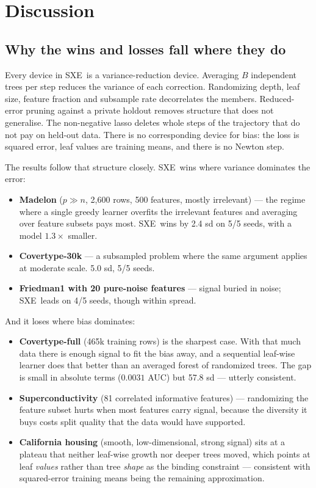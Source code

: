 \documentclass[11pt,a4paper]{article}
\newcommand{\SXE}{\textsc{SXE}}
\theoremstyle{definition}
\begin{document}
\section{Discussion}\label{sec:discussion}

\subsection{Why the wins and losses fall where they do}

Every device in \SXE\ is a variance-reduction device. Averaging $B$ independent
trees per step reduces the variance of each correction. Randomizing depth, leaf
size, feature fraction and subsample rate decorrelates the members.
Reduced-error pruning against a private holdout removes structure that does not
generalise. The non-negative lasso deletes whole steps of the trajectory that
do not pay on held-out data. There is no corresponding device for bias: the
loss is squared error, leaf values are training means, and there is no Newton
step.

The results follow that structure closely. \SXE\ wins where variance dominates
the error:
\begin{itemize}[leftmargin=1.5em,itemsep=1pt]
\item \textbf{Madelon} ($p \gg n$, 2{,}600 rows, 500 features, mostly
irrelevant) --- the regime where a single greedy learner overfits the
irrelevant features and averaging over feature subsets pays most. \SXE\ wins by
2.4 sd on 5/5 seeds, with a model $1.3\times$ smaller.
\item \textbf{Covertype-30k} --- a subsampled problem where the same argument
applies at moderate scale. 5.0 sd, 5/5 seeds.
\item \textbf{Friedman1 with 20 pure-noise features} --- signal buried in noise;
\SXE\ leads on 4/5 seeds, though within spread.
\end{itemize}

And it loses where bias dominates:
\begin{itemize}[leftmargin=1.5em,itemsep=1pt]
\item \textbf{Covertype-full} (465k training rows) is the sharpest case. With
that much data there is enough signal to fit the bias away, and a sequential
leaf-wise learner does that better than an averaged forest of randomized trees.
The gap is small in absolute terms ($0.0031$ AUC) but 57.8 sd --- utterly
consistent.
\item \textbf{Superconductivity} (81 correlated informative features) ---
randomizing the feature subset hurts when most features carry signal, because
the diversity it buys costs split quality that the data would have supported.
\item \textbf{California housing} (smooth, low-dimensional, strong signal) sits
at a plateau that neither leaf-wise growth nor deeper trees moved, which points
at leaf \emph{values} rather than tree \emph{shape} as the binding constraint
--- consistent with squared-error training means being the remaining
approximation.
\end{itemize}
\end{document}
